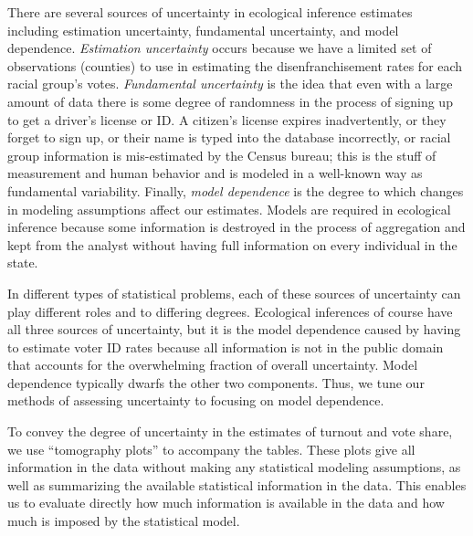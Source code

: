 \documentclass[12pt]{article}
\begin{document}
There are several sources of uncertainty in ecological inference
estimates including estimation uncertainty, fundamental uncertainty,
and model dependence.  \emph{Estimation uncertainty} occurs because we
have a limited set of observations (counties) to use in
estimating the disenfranchisement rates for each racial group's votes.
\emph{Fundamental uncertainty} is the idea that even with a large
amount of data there is some degree of randomness in the process of
signing up to get a driver's license or ID.  A citizen's license
expires inadvertently, or they forget to sign up, or their name is
typed into the database incorrectly, or racial group information is
mis-estimated by the Census bureau; this is the stuff of measurement
and human behavior and is modeled in a well-known way as fundamental
variability. Finally, \emph{model dependence} is the degree to which
changes in modeling assumptions affect our estimates.  Models are
required in ecological inference because some information is destroyed
in the process of aggregation and kept from the analyst without having
full information on every individual in the state.

In different types of statistical problems, each of these sources of
uncertainty can play different roles and to differing degrees.
Ecological inferences of course have all three sources of uncertainty,
but it is the model dependence caused by having to estimate voter ID
rates because all information is not in the public domain that
accounts for the overwhelming fraction of overall uncertainty.  Model
dependence typically dwarfs the other two components. Thus, we tune
our methods of assessing uncertainty to focusing on model dependence.

To convey the degree of uncertainty in the estimates of turnout and
vote share, we use ``tomography plots'' to accompany the tables.
These plots give all information in the data without making any
statistical modeling assumptions, as well as summarizing the available
statistical information in the data. This enables us to evaluate
directly how much information is available in the data and how much
is imposed by the statistical model.
\end{document}
